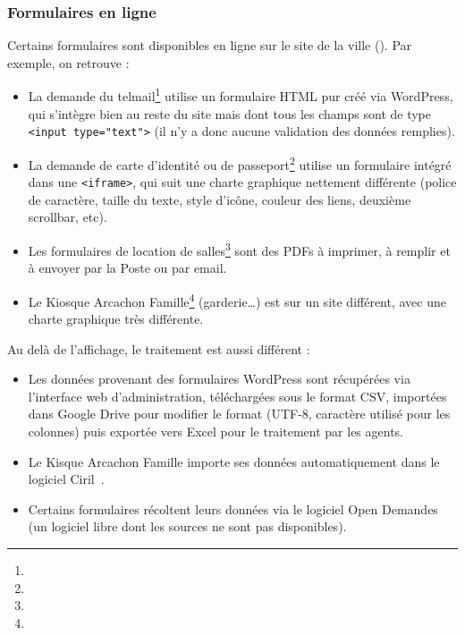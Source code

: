 \subsubsection{Formulaires en ligne}
\lstset{language=html}

Certains formulaires sont disponibles en ligne sur le site de la ville ().
Par exemple, on retrouve :
\begin{itemize}
	\item La demande du telmail\footnote{} utilise un formulaire HTML pur créé via WordPress, qui s'intègre bien au reste du site mais dont tous les champs sont de type \lstinline{<input type="text">} (il n'y a donc aucune validation des données remplies).
	\item La demande de carte d'identité ou de passeport\footnote{} utilise un formulaire intégré dans une \lstinline{<iframe>}, qui suit une charte graphique nettement différente (police de caractère, taille du texte, style d'icône, couleur des liens, deuxième scrollbar, etc).
	\item Les formulaires de location de salles\footnote{} sont des PDFs à imprimer, à remplir et à envoyer par la Poste ou par email.
	\item Le Kiosque Arcachon Famille\footnote{} (garderie…) est sur un site différent, avec une charte graphique très différente.
\end{itemize}

Au delà de l'affichage, le traitement est aussi différent :
\begin{itemize}
	\item Les données provenant des formulaires WordPress sont récupérées via l'interface web d'administration, téléchargées sous le format CSV, importées dans Google Drive pour modifier le format (UTF-8, caractère utilisé pour les colonnes) puis exportée vers Excel pour le traitement par les agents.
	\item Le Kisque Arcachon Famille importe ses données automatiquement dans le logiciel Ciril~\cite{ciril}.
	\item Certains formulaires récoltent leurs données via le logiciel Open Demandes~\cite{opendemandes} (un logiciel libre dont les sources ne sont pas disponibles).
\end{itemize}

